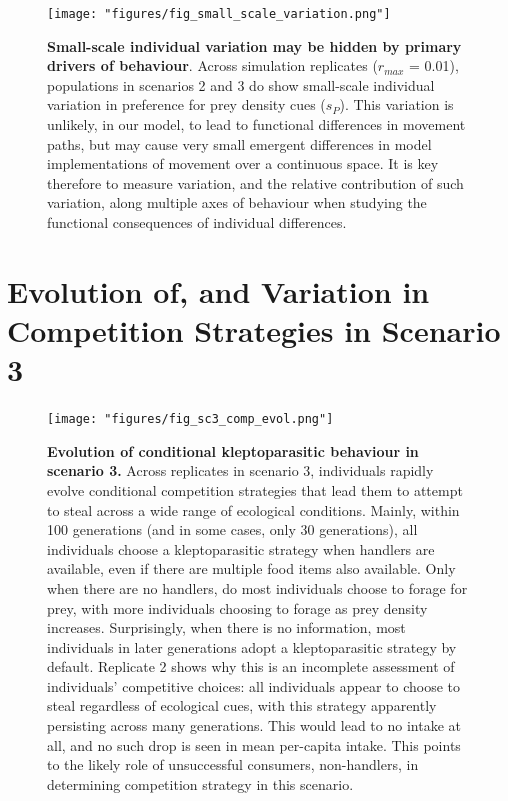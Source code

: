 \documentclass[]{scrartcl}
\begin{document}
\begin{figure}
\centering
\texttt{[image: "figures/fig\_small\_scale\_variation.png"]}
\caption{\textbf{Small-scale individual variation may be hidden by primary drivers of behaviour}. Across simulation replicates (\(r_{max}\) = 0.01), populations in scenarios 2 and 3 do show small-scale individual variation in preference for prey density cues (\(s_P\)). This variation is unlikely, in our model, to lead to functional differences in movement paths, but may cause very small emergent differences in model implementations of movement over a continuous space. It is key therefore to measure variation, and the relative contribution of such variation, along multiple axes of behaviour when studying the functional consequences of individual differences.}
\end{figure}

\newpage

\hypertarget{evolution-of-and-variation-in-competition-strategies-in-scenario-3}{%
\section{Evolution of, and Variation in Competition Strategies in Scenario 3}\label{evolution-of-and-variation-in-competition-strategies-in-scenario-3}}

\begin{figure}
\centering
\texttt{[image: "figures/fig\_sc3\_comp\_evol.png"]}
\caption{\textbf{Evolution of conditional kleptoparasitic behaviour in scenario 3.} Across replicates in scenario 3, individuals rapidly evolve conditional competition strategies that lead them to attempt to steal across a wide range of ecological conditions. Mainly, within 100 generations (and in some cases, only 30 generations), all individuals choose a kleptoparasitic strategy when handlers are available, even if there are multiple food items also available. Only when there are no handlers, do most individuals choose to forage for prey, with more individuals choosing to forage as prey density increases. Surprisingly, when there is no information, most individuals in later generations adopt a kleptoparasitic strategy by default. Replicate 2 shows why this is an incomplete assessment of individuals' competitive choices: all individuals appear to choose to steal regardless of ecological cues, with this strategy apparently persisting across many generations. This would lead to no intake at all, and no such drop is seen in mean per-capita intake. This points to the likely role of unsuccessful consumers, non-handlers, in determining competition strategy in this scenario.}
\end{figure}
\end{document}
